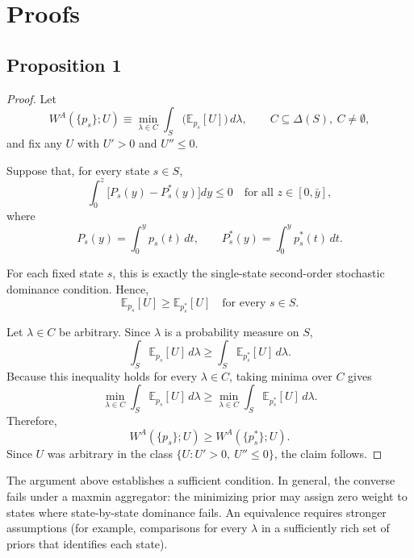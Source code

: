 \documentclass[Chp3.tex]{subfiles}
\begin{document}
\section{Proofs}
\label{app:DF_R}

\subsection{Proposition 1}

\begin{proof}

\par Let
\[
W^{A}(\{p_s\};U) \equiv \min_{\lambda \in C} \int_S \big(\mathbb{E}_{p_s}[U]\big)\,d\lambda,
\qquad C \subseteq \Delta(S),\ C\neq\emptyset,
\]
and fix any $U$ with $U' > 0$ and $U'' \leq 0$.

\par Suppose that, for every state $s \in S$,
\[
\int_0^z \big[P_s(y)-P_s^*(y)\big]dy \le 0
\quad\text{for all } z\in[0,\bar y],
\]
where
\[
P_s(y)=\int_0^y p_s(t)\,dt,
\qquad
P_s^*(y)=\int_0^y p_s^*(t)\,dt.
\]

\par For each fixed state $s$, this is exactly the single-state second-order stochastic dominance condition. Hence,
\[
\mathbb{E}_{p_s}[U] \ge \mathbb{E}_{p_s^*}[U]
\quad\text{for every } s\in S.
\]

\par Let $\lambda\in C$ be arbitrary. Since $\lambda$ is a probability measure on $S$,
\[
\int_S \mathbb{E}_{p_s}[U] \, d\lambda
\ge
\int_S \mathbb{E}_{p_s^*}[U] \, d\lambda.
\]
Because this inequality holds for every $\lambda\in C$, taking minima over $C$ gives
\[
\min_{\lambda\in C}\int_S \mathbb{E}_{p_s}[U] \, d\lambda
\ge
\min_{\lambda\in C}\int_S \mathbb{E}_{p_s^*}[U] \, d\lambda.
\]
Therefore,
\[
W^{A}(\{p_s\};U) \ge W^{A}(\{p_s^*\};U).
\]
Since $U$ was arbitrary in the class $\{U: U'>0,\ U''\le 0\}$, the claim follows.

\end{proof}

\begin{remak}
The argument above establishes a sufficient condition. In general, the converse fails under a maxmin aggregator: the minimizing prior may assign zero weight to states where state-by-state dominance fails. An equivalence requires stronger assumptions (for example, comparisons for every $\lambda$ in a sufficiently rich set of priors that identifies each state).
\end{remak}
\end{document}
